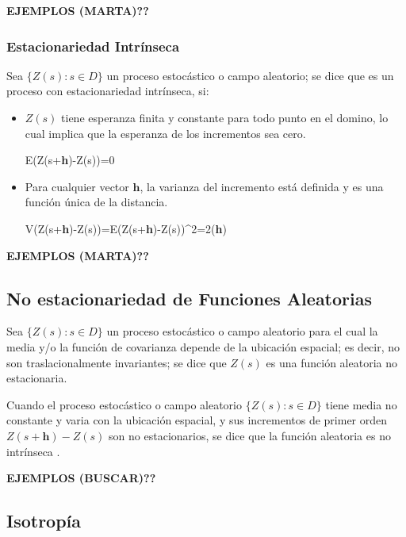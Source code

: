 \documentclass[
]{book}
\begin{document}
\textbf{EJEMPLOS (MARTA)??}

\hypertarget{estacionariedad-intruxednseca}{%
\subsubsection*{Estacionariedad Intrínseca}\label{estacionariedad-intruxednseca}}

Sea \(\{Z(s): s\in D\}\) un proceso estocástico o campo aleatorio; se dice que es un proceso con estacionariedad intrínseca, si:

\begin{itemize}
\item
  \(Z(s)\) tiene esperanza finita y constante para todo punto en el domino, lo cual implica que la esperanza de los incrementos sea cero.

  E(Z(s+\textbf{h})-Z(s))=0
\item
  Para cualquier vector \(\textbf{h}\), la varianza del incremento está definida y es una función única de la distancia.

  V(Z(s+\textbf{h})-Z(s))=E(Z(s+\textbf{h})-Z(s))\^{}2=2\gamma(\textbf{h})
\end{itemize}

\textbf{EJEMPLOS (MARTA)??}

\hypertarget{no-estacionariedad-de-funciones-aleatorias}{%
\subsection{No estacionariedad de Funciones Aleatorias}\label{no-estacionariedad-de-funciones-aleatorias}}

Sea \(\{Z(s): s\in D\}\) un proceso estocástico o campo aleatorio para el cual la media y/o la función de covarianza depende de la ubicación espacial; es decir, no son traslacionalmente invariantes; se dice que \(Z(s)\) es una función aleatoria no estacionaria.

Cuando el proceso estocástico o campo aleatorio \(\{Z(s): s\in D\}\) tiene media no constante y varia con la ubicación espacial, y sus incrementos de primer orden \(Z(s+\textbf{h})-Z(s)\) son no estacionarios, se dice que la función aleatoria es no intrínseca \citep{montero}.

\textbf{EJEMPLOS (BUSCAR)??}

\hypertarget{isotropuxeda}{%
\subsection{Isotropía}\label{isotropuxeda}}
\end{document}
